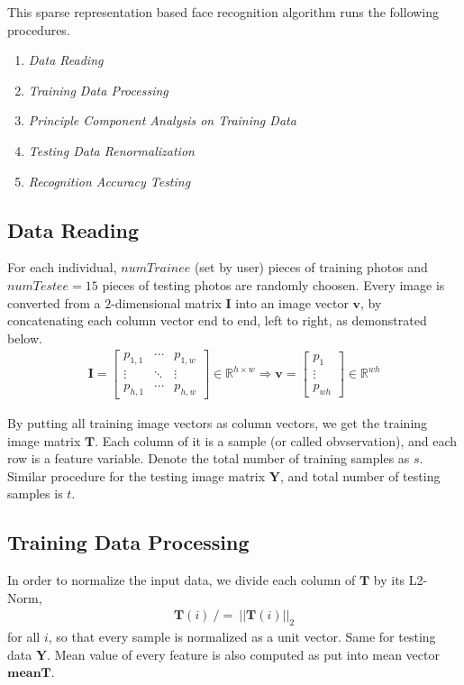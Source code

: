 \documentclass[10pt,journal]{IEEEtran}
\renewcommand{\[}{\begin{equation*} \begin{aligned}} %
\renewcommand{\]}{\end{aligned} \end{equation*}}
\begin{document}
This sparse representation based face recognition algorithm runs the following procedures.
\begin{enumerate}
	\item \textit{Data Reading}
	\item \textit{Training Data Processing}
	\item \textit{Principle Component Analysis on Training Data}
	\item \textit{Testing Data Renormalization}
	\item \textit{Recognition Accuracy Testing}
\end{enumerate}

\subsection{\large Data Reading}
For each individual, $numTrainee$ (set by user) pieces of training photos and $numTestee = 15$ pieces of testing photos are randomly choosen. Every image is converted from a $2$-dimensional matrix $\mathbf{I}$ into an image vector $\mathbf{v}$, by concatenating each column vector end to end, left to right, as demonstrated below.
\[
	\mathbf{I} = \begin{bmatrix}
		p_{1,1} & \cdots & p_{1,w} \\
		\vdots & \ddots & \vdots \\
		p_{h,1} & \cdots & p_{h,w}
	\end{bmatrix} \in \mathbb{R}^{h \times w} \Rightarrow \mathbf{v} = \begin{bmatrix}
		p_1 \\
		\vdots \\
		p_{wh}
	\end{bmatrix} \in \mathbb{R}^{wh}
\]

By putting all training image vectors as column vectors, we get the training image matrix $\mathbf{T}$. Each column of it is a sample (or called obvservation), and each row is a feature variable. Denote the total number of training samples as $s$. Similar procedure for the testing image matrix $\mathbf{Y}$, and total number of testing samples is $t$.

\subsection{\large Training Data Processing}
In order to normalize the input data, we divide each column of $\mathbf{T}$ by its L2-Norm, 
\[
	\mathbf{T}(i) \ /= \ ||\mathbf{T}(i)||_2
\]
for all $i$, so that every sample is normalized as a unit vector. Same for testing data $\mathbf{Y}$. Mean value of every feature is also computed as put into mean vector $\mathbf{meanT}$.
\end{document}
